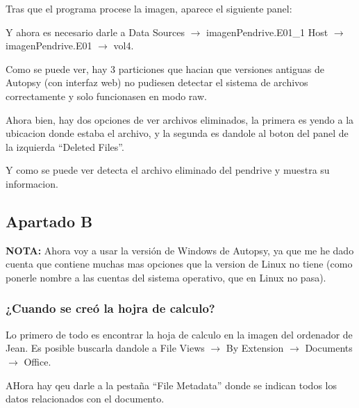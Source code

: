 \documentclass{article}
\begin{document}

Tras que el programa procese la imagen, aparece el siguiente panel:


Y ahora es necesario darle a Data Sources $\rightarrow$ imagenPendrive.E01\_1 Host $\rightarrow$ imagenPendrive.E01 $\rightarrow$ vol4.


Como se puede ver, hay 3 particiones que hacian que versiones antiguas de Autopsy (con interfaz web) no pudiesen detectar el sistema de archivos correctamente y solo funcionasen en modo raw.

Ahora bien, hay dos opciones de ver archivos eliminados, la primera es yendo a la ubicacion donde estaba el archivo, y la segunda es dandole al boton del panel de la izquierda ``Deleted Files''.


Y como se puede ver detecta el archivo eliminado del pendrive y muestra su informacion.


\subsection*{Apartado B}

\textbf{NOTA: }Ahora voy a usar la versión de Windows de Autopsy, ya que me he dado cuenta que contiene muchas mas opciones que la version de Linux no tiene (como ponerle nombre a las cuentas del sistema operativo, que en Linux no pasa).

\subsubsection*{¿Cuando se creó la hojra de calculo?}

Lo primero de todo es encontrar la hoja de calculo en la imagen del ordenador de Jean. Es posible buscarla dandole a File Views $\rightarrow$ By Extension $\rightarrow$ Documents $\rightarrow$ Office.


AHora hay qeu darle a la pestaña ``File Metadata'' donde se indican todos los datos relacionados con el documento.

\end{document}
